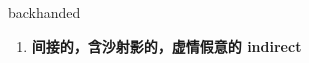 
\begin{frame}
{\huge backhanded}
\begin{center}
\begin{enumerate}\Large
  \item \textbf{间接的，含沙射影的，虚情假意的 indirect}
\end{enumerate}
\end{center}
\end{frame}

